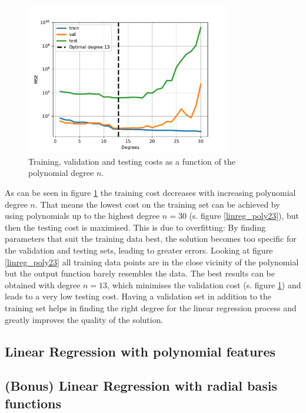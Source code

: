 \documentclass{article}
\begin{document}
\begin{figure}[!ht]
\centering
\includegraphics[width=0.8\textwidth]{./Figures/linreg_poly4_errors.pdf}
\caption{Training, validation and testing costs as a function of the polynomial degree $n$.}
\label{linreg_poly4}
\end{figure}

As can be seen in figure \ref{linreg_poly4} the training cost decreases with increasing polynomial degree $n$. That means the lowest cost on the training set can be achieved by using polynomials up to the highest degree $n=30$ (s. figure \ref{linreg_poly23}), but then the testing cost is maximised. This is due to overfitting: By finding parameters that suit the training data best, the solution becomes too specific for the validation and testing sets, leading to greater errors. Looking at figure \ref{linreg_poly23} all training data points are in the close vicinity of the polynomial but the output function barely resembles the data. The best results can be obtained with degree $n=13$, which minimises the validation cost (s. figure \ref{linreg_poly4}) and leads to a very low testing cost. Having a validation set in addition to the training set helps in finding the right degree for the linear regression process and greatly improves the quality of the solution.

\newpage

\subsection{Linear Regression with polynomial features}


\subsection{(Bonus) Linear Regression with radial basis functions}
\end{document}
